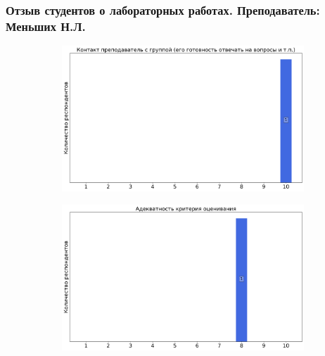 	\subsubsection{Отзыв студентов о лабораторных работах. Преподаватель: Меньших Н.Л.}
		\begin{figure}[H]
			\centering
			\begin{subfigure}[b]{0.45\textwidth}
				\centering
				\includegraphics[width=\textwidth]{images/2 course/Общая физика - электричество и магнетизм/labniks-marks-Меньших Н.Л.-0.png}
			\end{subfigure}
			\begin{subfigure}[b]{0.45\textwidth}
				\centering
				\includegraphics[width=\textwidth]{images/2 course/Общая физика - электричество и магнетизм/labniks-marks-Меньших Н.Л.-1.png}
			\end{subfigure}
			\begin{subfigure}[b]{0.45\textwidth}
				\centering

\end{subfigure}
\end{figure}
